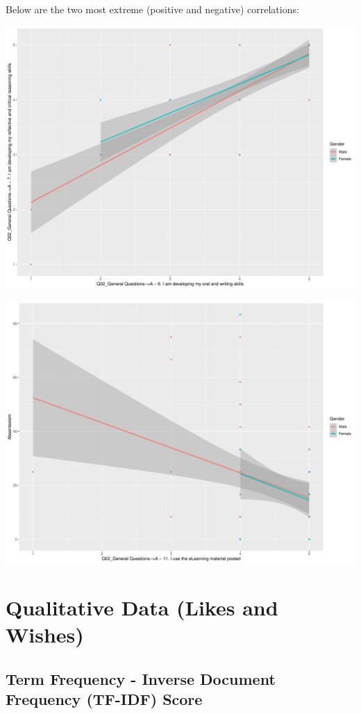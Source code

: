 \documentclass[
]{article}
\begin{document}
Below are the two most extreme (positive and negative) correlations:

\includegraphics{AnalysisOfCourseEvaluation-Notebook_files/figure-latex/DrillDownCorr1-1.pdf}

\includegraphics{AnalysisOfCourseEvaluation-Notebook_files/figure-latex/DrillDownCorr2-1.pdf}

\newpage

\section{Qualitative Data (Likes and
Wishes)}\label{qualitative-data-likes-and-wishes}

\subsection{Term Frequency - Inverse Document Frequency (TF-IDF)
Score}\label{term-frequency---inverse-document-frequency-tf-idf-score}
\end{document}
